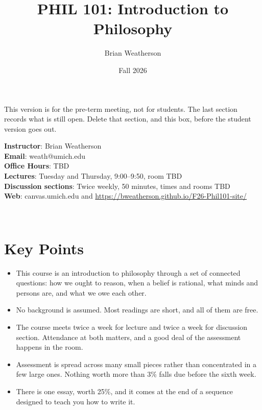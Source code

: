 \documentclass[
  letterpaper,
  DIV=11,
  numbers=noendperiod]{scrartcl}
\title{PHIL 101: Introduction to Philosophy}
\author{Brian Weatherson}
\date{Fall 2026}
\providecommand{\tightlist}{%
  \setlength{\itemsep}{0pt}\setlength{\parskip}{0pt}}
\begin{document}
\maketitle


\begin{tcolorbox}[enhanced jigsaw, arc=.35mm, bottomrule=.15mm, bottomtitle=1mm, breakable, colback=white, colbacktitle=quarto-callout-important-color!10!white, colframe=quarto-callout-important-color-frame, coltitle=black, left=2mm, leftrule=.75mm, opacityback=0, opacitybacktitle=0.6, rightrule=.15mm, title=\textcolor{quarto-callout-important-color}{\faExclamation}\hspace{0.5em}{Draft for discussion with GSIs}, titlerule=0mm, toprule=.15mm, toptitle=1mm]

This version is for the pre-term meeting, not for students. The last
section records what is still open. Delete that section, and this box,
before the student version goes out.

\end{tcolorbox}

\textbf{Instructor}: Brian Weatherson\\
\textbf{Email}: weath@umich.edu\\
\textbf{Office Hours}: TBD\\
\textbf{Lectures}: Tuesday and Thursday, 9:00--9:50, room TBD\\
\textbf{Discussion sections}: Twice weekly, 50 minutes, times and rooms
TBD\\
\textbf{Web}: canvas.umich.edu and
\url{https://bweatherson.github.io/F26-Phil101-site/}

~

\section{Key Points}\label{key-points}

\begin{itemize}
\tightlist
\item
  This course is an introduction to philosophy through a set of
  connected questions: how we ought to reason, when a belief is
  rational, what minds and persons are, and what we owe each other.
\item
  No background is assumed. Most readings are short, and all of them are
  free.
\item
  The course meets twice a week for lecture and twice a week for
  discussion section. Attendance at both matters, and a good deal of the
  assessment happens in the room.
\item
  Assessment is spread across many small pieces rather than concentrated
  in a few large ones. Nothing worth more than 3\% falls due before the
  sixth week.
\item
  There is one essay, worth 25\%, and it comes at the end of a sequence
  designed to teach you how to write it.
\end{itemize}
\end{document}
